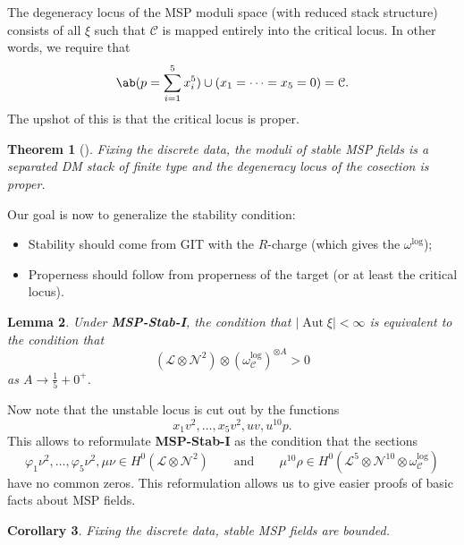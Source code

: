 \documentclass[10pt]{amsart}
\newtheorem{thm}{Theorem}[section]
\newtheorem{cor}[thm]{Corollary}
\newtheorem{lem}[thm]{Lemma}
\theoremstyle{definition}
\theoremstyle{remark}
\theoremstyle{plain}
\theoremstyle{definition}
\theoremstyle{remark}
\newcommand{\mc}[1]{\mathcal{#1}}
\newcommand{\1}{\mathbf{1}}
\newcommand{\2}{\mathbf{2}}
\newcommand{\3}{\mathbf{3}}
\DeclareMathOperator{\Aut}{Aut}
\begin{document}
The degeneracy locus of the MSP moduli space (with reduced stack structure) consists of all $\xi$ such that $\mc{C}$ is mapped entirely into the critical locus. In other words, we require that
\[ \ab(p = \sum_{i=1}^5 x_i^5) \cup (x_1 = \cdots = x_5 = 0) = \mc{C}. \]
The upshot of this is that the critical locus is proper.

\begin{thm}[\cite{mspfermat}]
    Fixing the discrete data, the moduli of stable MSP fields is a separated DM stack of finite type and the degeneracy locus of the cosection is proper.
\end{thm}

Our goal is now to generalize the stability condition:
\begin{itemize}
    \item Stability should come from GIT with the $R$-charge (which gives the $\omega^{\log}$);
    \item Properness should follow from properness of the target (or at least the critical locus).
\end{itemize}

\begin{lem}
        Under \textbf{MSP-Stab-I}, the condition that $|\Aut \xi|<\infty$ is equivalent to the condition that
        \[ (\mc{L} \otimes \mc{N}^2) \otimes ( \omega_{\mc{C}}^{\log} )^{\otimes A} > 0 \]
        as $A \to \frac{1}{5} + 0^+$.
\end{lem}

Now note that the unstable locus is cut out by the functions
\[ x_1 v^2, \ldots, x_5 v^2, uv, u^{10}p. \]
This allows to reformulate \textbf{MSP-Stab-I} as the condition that the sections
\[ \varphi_1 \nu^2, \ldots, \varphi_5 \nu^2, \mu\nu \in H^0(\mc{L} \otimes \mc{N}^2) \qquad \text{and} \qquad \mu^{10}\rho \in H^0(\mc{L}^5 \otimes \mc{N}^{10}\otimes \omega_{\mc{C}}^{\log}) \]
have no common zeros. This reformulation allows us to give easier proofs of basic facts about MSP fields.

\begin{cor}
    Fixing the discrete data, stable MSP fields are bounded.
\end{cor}
\end{document}
